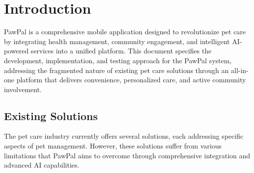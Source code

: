 \chapter{Introduction}
\label{sec:introduction}
PawPal is a comprehensive mobile application designed to revolutionize pet care by integrating health management, community engagement, and intelligent AI-powered services into a unified platform. This document specifies the development, implementation, and testing approach for the PawPal system, addressing the fragmented nature of existing pet care solutions through an all-in-one platform that delivers convenience, personalized care, and active community involvement.

\section{Existing Solutions}

The pet care industry currently offers several solutions, each addressing specific aspects of pet management. However, these solutions suffer from various limitations that PawPal aims to overcome through comprehensive integration and advanced AI capabilities.

